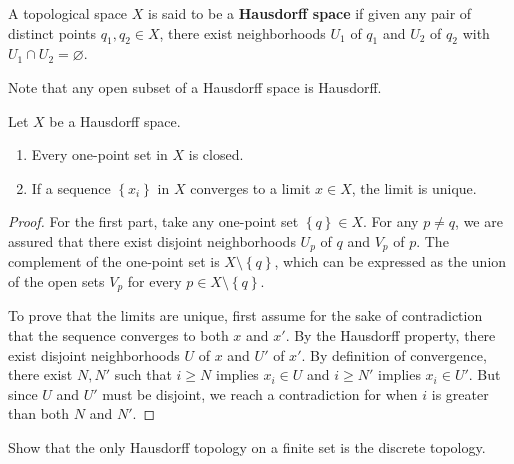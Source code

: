 \documentclass{mathnotes}
\begin{document}
\begin{defn}
    A topological space $X$ is said to be a \textbf{Hausdorff space} if given any pair of distinct points $q_1, q_2\in X$, there
    exist neighborhoods $U_1$ of $q_1$ and $U_2$ of $q_2$ with $U_1\cap U_2=\varnothing$.
\end{defn}

Note that any open subset of a Hausdorff space is Hausdorff.

\begin{lem}
    Let $X$ be a Hausdorff space.
    \begin{enumerate}
        \item Every one-point set in $X$ is closed.
        \item If a sequence $\left\{ x_i \right\}$ in $X$ converges to a limit $x\in X$, the limit is unique.
    \end{enumerate}
\end{lem}

\begin{proof}
    For the first part, take any one-point set $\left\{ q \right\}\in X$. For any $p\neq q$, we are assured that there exist
    disjoint neighborhoods $U_p$ of $q$ and $V_p$ of $p$. The complement of the one-point set is $X\setminus \left\{q\right\}$, which can be
    expressed as the union of the open sets $V_p$ for every $p\in X\setminus\left\{ q \right\}$.

    To prove that the limits are unique, first assume for the sake of contradiction that the sequence converges to both $x$ and $x'$.
    By the Hausdorff property, there exist disjoint neighborhoods $U$ of $x$ and $U'$ of $x'$. By definition of convergence, there
    exist $N, N'$ such that $i\geq N$ implies $x_i\in U$ and $i\geq N'$ implies $x_i\in U'$. But since $U$ and $U'$ must be disjoint,
    we reach a contradiction for when $i$ is greater than both $N$ and $N'$.
\end{proof}

\begin{exc}
    Show that the only Hausdorff topology on a finite set is the discrete topology.
\end{exc}
\end{document}
